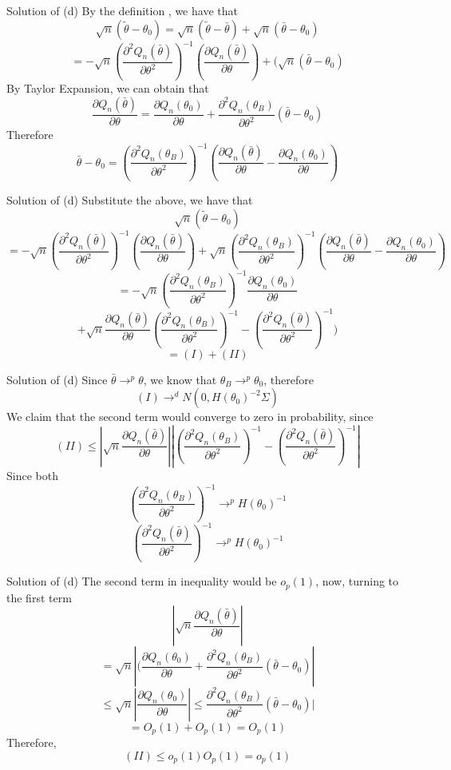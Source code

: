 \documentclass{beamer}
\begin{document}
\begin{frame}{Solution of (d)}
	By the definition , we have that 
	\[\sqrt{n}(\tilde{\theta} - \theta_0) = \sqrt{n}(\tilde{\theta} - \bar{\theta}) + \sqrt{n}(\bar{\theta} - \theta_0)\]
	\[ = -\sqrt{n}(\frac{\partial^2 Q_n(\bar{\theta})}{\partial \theta^2})^{-1} (\frac{\partial Q_n(\bar{\theta})}{\partial \theta}) + (\sqrt{n}(\bar{\theta} - \theta_0)\]
		By Taylor Expansion, we can obtain that 
		\[\frac{\partial Q_n(\bar{\theta})}{\partial \theta}  = \frac{\partial Q_n(\theta_0)}{\partial \theta} + \frac{\partial^2 Q_n(\theta_B)}{\partial \theta^2}(\bar{\theta} - \theta_0)\]
		Therefore
		\[\bar{\theta} - \theta_0 = (\frac{\partial^2 Q_n(\theta_B)}{\partial \theta^2})^{-1} (\frac{\partial Q_n(\bar{\theta})}{\partial \theta}  -  \frac{\partial Q_n(\theta_0)}{\partial \theta})\]
\end{frame}
\begin{frame}{Solution of (d)}
	Substitute the above, we have that 
	\[\sqrt{n}(\tilde{\theta} - \theta_0)\]
	\[=-\sqrt{n}(\frac{\partial^2 Q_n(\bar{\theta})}{\partial \theta^2})^{-1} (\frac{\partial Q_n(\bar{\theta})}{\partial \theta})+ \sqrt{n} (\frac{\partial^2 Q_n(\theta_B)}{\partial \theta^2})^{-1} (\frac{\partial Q_n(\bar{\theta})}{\partial \theta}  -  \frac{\partial Q_n(\theta_0)}{\partial \theta})\]
\[= -\sqrt{n} (\frac{\partial^2 Q_n(\theta_B)}{\partial \theta^2})^{-1}\frac{\partial Q_n(\theta_0)}{\partial \theta} \]
\[+\sqrt{n}\frac{\partial Q_n(\bar{\theta})}{\partial \theta} (\frac{\partial^2 Q_n(\theta_B)}{\partial \theta^2})^{-1} - (\frac{\partial^2 Q_n(\bar{\theta})}{\partial \theta^2})^{-1}) \]
\[ = (I) + (II)\]
\end{frame}
\begin{frame}{Solution of (d)}
	Since $\bar{\theta} \rightarrow^p \theta$, we know that $\theta_B \rightarrow^p \theta_0$, therefore
	\[(I) \rightarrow^d N(0,H(\theta_0)^{-2} \Sigma)\]
	We claim that the second term would converge to zero in probability, since
\[(II) \leq |\sqrt{n}\frac{\partial Q_n(\bar{\theta})}{\partial \theta}| |(\frac{\partial^2 Q_n(\theta_B)}{\partial \theta^2})^{-1} - (\frac{\partial^2 Q_n(\bar{\theta})}{\partial \theta^2})^{-1}|\]
Since both 
\[(\frac{\partial^2 Q_n(\theta_B)}{\partial \theta^2})^{-1} \rightarrow^p H(\theta_0)^{-1}\]
\[(\frac{\partial^2 Q_n(\bar{\theta})}{\partial \theta^2})^{-1} \rightarrow^p H(\theta_0)^{-1}\]
\end{frame}
\begin{frame}{Solution of (d)}
	The second term in inequality would be $o_p(1)$, now, turning to the first term
	\[|\sqrt{n}\frac{\partial Q_n(\bar{\theta})}{\partial \theta}|\]
\[ = \sqrt{n} |(\frac{\partial Q_n(\theta_0)}{\partial \theta} + \frac{\partial^2 Q_n(\theta_B)}{\partial \theta^2} (\bar{\theta} - \theta_0)|\]
\[\leq \sqrt{n} |\frac{\partial Q_n(\theta_0)}{\partial \theta}| \leq \frac{\partial^2 Q_n(\theta_B)}{\partial\theta^2} (\bar{\theta} - \theta_0)|\]
\[ = O_p(1) + O_p(1) = O_p(1)\]
Therefore,
\[(II) \leq o_p(1) O_p(1) = o_p(1)\]
\end{frame}
\end{document}

